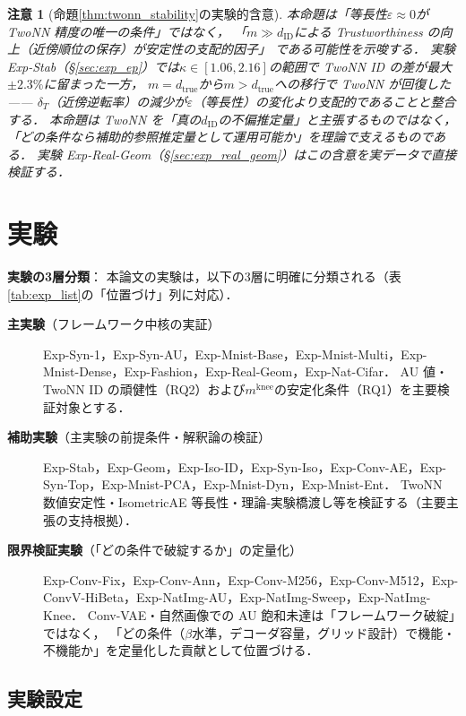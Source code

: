 \documentclass[11pt,a4paper]{jsarticle}
\newtheorem{remark}{注意}
\newcommand{\kap}{\kappa}
\newcommand{\mknee}{m^{\mathrm{knee}}}
\begin{document}
\begin{remark}[命題\ref{thm:twonn_stability}の実験的含意]
本命題は「等長性$\varepsilon \approx 0$が TwoNN 精度の唯一の条件」ではなく，
「$m \gg d_\mathrm{ID}$による Trustworthiness の向上（近傍順位の保存）が安定性の支配的因子」
である可能性を示唆する．
実験 Exp-Stab（§\ref{sec:exp_ep}）では$\kap \in [1.06, 2.16]$の範囲で TwoNN ID の差が最大$\pm 2.3\%$に留まった一方，
$m = d_\mathrm{true}$から$m > d_\mathrm{true}$への移行で TwoNN が回復した——
$\delta_T$（近傍逆転率）の減少が$\varepsilon$（等長性）の変化より支配的であることと整合する．
本命題は TwoNN を「真の$d_\mathrm{ID}$の不偏推定量」と主張するものではなく，
「どの条件なら補助的参照推定量として運用可能か」を理論で支えるものである．
実験 Exp-Real-Geom（§\ref{sec:exp_real_geom}）はこの含意を実データで直接検証する．
\end{remark}

\section{実験}\label{sec:exp}

\textbf{実験の3層分類}：
本論文の実験は，以下の3層に明確に分類される（表\ref{tab:exp_list}の「位置づけ」列に対応）．
\begin{description}
  \item[\textbf{主実験}（フレームワーク中核の実証）]
        Exp-Syn-1，Exp-Syn-AU，Exp-Mnist-Base，Exp-Mnist-Multi，Exp-Mnist-Dense，Exp-Fashion，Exp-Real-Geom，Exp-Nat-Cifar．
        AU 値・TwoNN ID の頑健性（RQ2）および$\mknee$の安定化条件（RQ1）を主要検証対象とする．
  \item[\textbf{補助実験}（主実験の前提条件・解釈論の検証）]
        Exp-Stab，Exp-Geom，Exp-Iso-ID，Exp-Syn-Iso，Exp-Conv-AE，Exp-Syn-Top，Exp-Mnist-PCA，Exp-Mnist-Dyn，Exp-Mnist-Ent．
        TwoNN 数値安定性・IsometricAE 等長性・理論-実験橋渡し等を検証する（主要主張の支持根拠）．
  \item[\textbf{限界検証実験}（「どの条件で破綻するか」の定量化）]
        Exp-Conv-Fix，Exp-Conv-Ann，Exp-Conv-M256，Exp-Conv-M512，Exp-ConvV-HiBeta，Exp-NatImg-AU，Exp-NatImg-Sweep，Exp-NatImg-Knee．
        Conv-VAE・自然画像での AU 飽和未達は「フレームワーク破綻」ではなく，
        「どの条件（$\beta$水準，デコーダ容量，グリッド設計）で機能・不機能か」を定量化した貢献として位置づける．
\end{description}

\subsection{実験設定}\label{sec:exp_setup}
\end{document}
